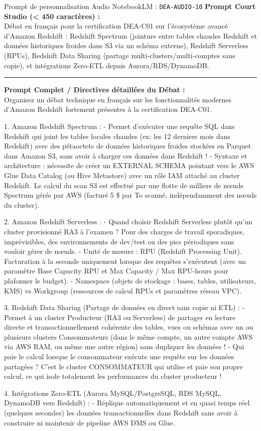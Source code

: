 \documentclass[11pt,a4paper]{article}
\begin{document}
\begin{promptbox}{Prompt de personnalisation Audio NotebookLM : \texttt{DEA-AUDIO-10}}
\textbf{Prompt Court Studio (< 450 caractères) :}\\
Débat en français pour la certification DEA-C01 sur l'écosystème avancé d'Amazon Redshift : Redshift Spectrum (jointure entre tables chaudes Redshift et données historiques froides dans S3 via un schéma externe), Redshift Serverless (RPUs), Redshift Data Sharing (partage multi-clusters/multi-comptes sans copie), et intégrations Zero-ETL depuis Aurora/RDS/DynamoDB.

\medskip\hrule\medskip
\textbf{Prompt Complet / Directives détaillées du Débat :}\\
Organisez un débat technique en français sur les fonctionnalités modernes d'Amazon Redshift fortement présentes à la certification DEA-C01.

1. Amazon Redshift Spectrum :
- Permet d'exécuter une requête SQL dans Redshift qui joint les tables locales chaudes (ex: les 12 derniers mois dans Redshift) avec des pétaoctets de données historiques froides stockées en Parquet dans Amazon S3, sans avoir à charger ces données dans Redshift !
- Syntaxe et architecture : nécessite de créer un EXTERNAL SCHEMA pointant vers le AWS Glue Data Catalog (ou Hive Metastore) avec un rôle IAM attaché au cluster Redshift. Le calcul du scan S3 est effectué par une flotte de milliers de nœuds Spectrum gérés par AWS (facturé 5 \$ par To scanné, indépendamment des nœuds du cluster).

2. Amazon Redshift Serverless :
- Quand choisir Redshift Serverless plutôt qu'un cluster provisionné RA3 à l'examen ? Pour des charges de travail sporadiques, imprévisibles, des environnements de dev/test ou des pics périodiques sans vouloir gérer de nœuds.
- Unité de mesure : RPU (Redshift Processing Unit). Facturation à la seconde uniquement lorsque des requêtes s'exécutent (avec un paramètre Base Capacity RPU et Max Capacity / Max RPU-hours pour plafonner le budget).
- Namespace (objets de stockage : bases, tables, utilisateurs, KMS) vs Workgroup (ressources de calcul RPUs et paramètres réseau VPC).

3. Redshift Data Sharing (Partage de données en direct sans copie ni ETL) :
- Permet à un cluster Producteur (RA3 ou Serverless) de partager en lecture directe et transactionnellement cohérente des tables, vues ou schémas avec un ou plusieurs clusters Consommateurs (dans le même compte, un autre compte AWS via AWS RAM, ou même une autre région) sans dupliquer les données !
- Qui paie le calcul lorsque le consommateur exécute une requête sur les données partagées ? C'est le cluster CONSOMMATEUR qui utilise et paie son propre calcul, ce qui isole totalement les performances du cluster producteur !

4. Intégrations Zero-ETL (Aurora MySQL/PostgreSQL, RDS MySQL, DynamoDB vers Redshift) :
- Réplique automatiquement et en quasi temps réel (quelques secondes) les données transactionnelles dans Redshift sans avoir à construire ni maintenir de pipeline AWS DMS ou Glue.
\end{promptbox}
\end{document}
